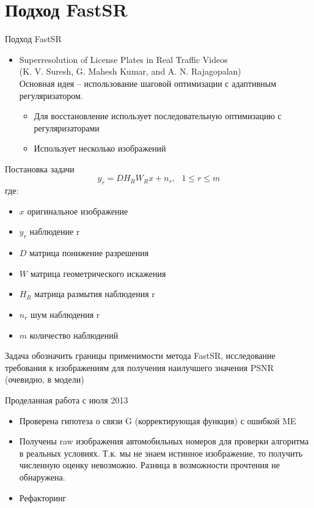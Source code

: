 \section{Подход FastSR}
\begin{frame}{Подход FastSR}
  \begin{itemize}
    \item Superresolution of License Plates in Real Traffic Videos \\
      (K. V. Suresh, G. Mahesh Kumar, and A. N. Rajagopalan) \\
      Основная идея -- использование шаговой оптимизации с адаптивным регуляризатором.
      \begin{itemize}
        \item Для восстановление использует последовательную оптимизацию с
          регуляризаторами
        \item Использует несколько изображений
      \end{itemize}
  \end{itemize}
\end{frame}
\begin{frame}{Постановка задачи}
 $$y_r = D H_R W_R x + n_r,~ ~ ~ 1 \leq r \leq m$$
 где:
 \begin{itemize}
   \item $x$ оригинальное изображение
   \item $y_r$ наблюдение r
   \item $D$ матрица понижение разрешения
   \item $W$ матрица геометрического искажения
   \item $H_R$ матрица размытия наблюдения r
   \item $n_r$ шум наблюдения r
   \item $m$ количество наблюдений
 \end{itemize}
 Задача обозначить границы применимости метода FastSR, исследование требования к изображениям для получения наилучшего
 значения PSNR (очевидно, в модели)
\end{frame}


\begin{frame}{Проделанная работа с июля 2013 }
  \begin{itemize}
    \item Проверена гипотеза о связи G (корректирующая функция) с ошибкой ME
    \item Получены raw изображения автомобильных номеров для проверки алгоритма в реальных условиях. Т.к. мы не знаем
      истинное изображение, то получить численную оценку невозможно. Разница в возможности прочтения не обнаружена.
    \item Рефакторинг
  \end{itemize}
\end{frame}

